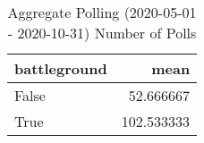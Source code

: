 \begin{table}
\centering
\caption{Aggregate Polling (2020-05-01 - 2020-10-31) Number of Polls}
\label{table:aggregate\_polling\_2020-05-01\_-\_2020-10-31\_number\_of\_polls}
\begin{tabular}{lr}
\toprule
 battleground &        mean \\
\midrule
        False &   52.666667 \\
         True &  102.533333 \\
\bottomrule
\end{tabular}
\end{table}
